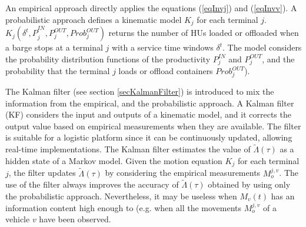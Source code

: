 An empirical approach directly applies the equations (\ref{eqInvj}) and (\ref{eqInvv}). A probabilistic approach defines a kinematic model $K_j$ for each terminal $j$. $K_j({\delta^t,P}_j^{IN},P_j^{OUT},Prob_j^{OUT})$ returns the number of HUs loaded or offloaded when a barge stops at a terminal $j$ with a service time windows $\delta^t$. The model considers the probability distribution functions of the productivity $P_j^{IN}$ and $P_j^{OUT}$, and the probability that the terminal $j$ loads or offload containers $Prob_j^{OUT}$). \par

The Kalman filter (see section \ref{secKalmanFilter}) is introduced to mix the information from the empirical, and the probabilistic approach. A Kalman filter (KF) considers the input and outputs of a kinematic model, and it corrects the output value based on empirical measurements when they are available. The filter is suitable for a logistic platform since it can be continuously updated, allowing real-time implementations. The Kalman filter estimates the value of $\widetilde{\Lambda}(\tau)$ as a hidden state of a Markov model. Given the motion equation $K_j$ for each terminal $j$, the filter updates $\widetilde{\Lambda}\left(\tau\right)$ by considering the empirical measurements $M_o^{j,v}$. The use of the filter always improves the accuracy of $\widetilde{\Lambda}\left(\tau\right)$ obtained by using only the probabilistic approach. Nevertheless, it may be useless when $M_v(t)$ has an information content high enough to (e.g. when all the movements $M_o^{j,v}$ of a vehicle $v$ have been observed. 









